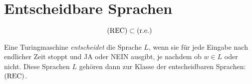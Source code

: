 \chapter{Entscheidbare Sprachen}\label{sec:rec}
\begin{equation*}
	\mathrm{(REC)}\subset\mathrm{(r.e.)}
\end{equation*}

Eine Turingmaschine \emph{entscheidet} die Sprache $L$, wenn sie für jede Eingabe nach endlicher Zeit stoppt und JA oder NEIN ausgibt, je nachdem ob $w\in L$ oder nicht.
Diese Sprachen $L$ gehören dann zur Klasse der entscheidbaren Sprachen: $\mathrm{(REC)}$.
